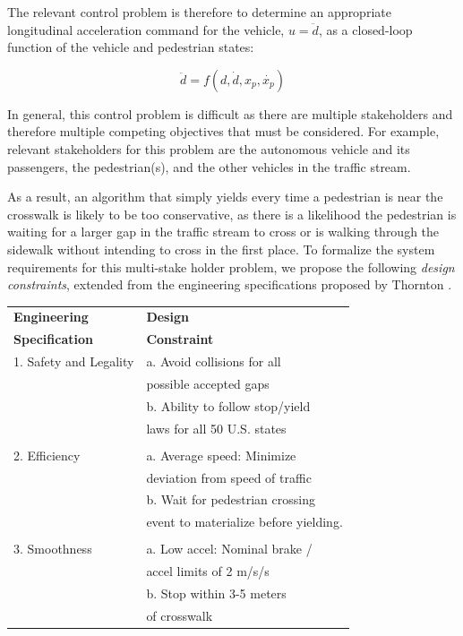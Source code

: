 \documentclass[letterpaper, 10 pt, conference]{ieeeconf}  %
\begin{document}
The relevant control problem is therefore to determine an appropriate longitudinal acceleration command for the vehicle, $u = \ddot{d}$, as a closed-loop function of the vehicle and pedestrian states:

\begin{equation}
\ddot{d} = f(d, \dot{d}, x_p, \dot{x_p})
\end{equation}

In general, this control problem is difficult as there are multiple stakeholders and therefore multiple competing objectives that must be considered. For example, relevant stakeholders for this problem are the autonomous vehicle and its passengers, the pedestrian(s), and the other vehicles in the traffic stream. 

As a result, an algorithm that simply yields every time a pedestrian is near the crosswalk is likely to be too conservative, as there is a likelihood the pedestrian is waiting for a larger gap in the traffic stream to cross or is walking through the sidewalk without intending to cross in the first place. To formalize the system requirements for this multi-stake holder problem, we propose the following \textit{design constraints}, extended from the engineering specifications proposed by Thornton \cite{Thornton2018}. 

\begin{center}
\begin{tabular}{ l| l }
\label{tb:specs}
 \textbf{Engineering} & \textbf{Design} \\
 \textbf{Specification} & \textbf{Constraint}\\\hline 
 1. Safety and Legality & a. Avoid collisions for all\\
                     & possible accepted gaps                        \\
                     &b. Ability to follow stop/yield    \\
                     &laws for all 50 U.S. states\\
                     
&\\
 2. Efficiency & a. Average speed: Minimize  \\ 
               & deviation from speed of traffic \\    
               & b. Wait for pedestrian crossing \\
               & event to materialize before yielding. \\ 

               & \\
 3. Smoothness & a. Low accel: Nominal brake / \\ 
 			   & accel limits of 2 m/s/s \\
 			   & b. Stop within 3-5 meters\\
 			   & of crosswalk

\end{tabular}
\end{center}
\end{document}
